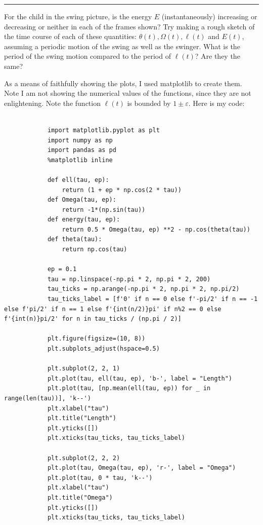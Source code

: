 \documentclass[12pt]{article}
\newcommand{\jump}{\vspace{5mm}}
\newcommand{\ep}{\varepsilon}
\begin{document}
\begin{enumerate}[]
        \hrule
        
        \jump
        For the child in the swing picture, is the energy $E$ (instantaneously) increasing or decreasing or neither in each of the frames shown? Try making a rough sketch of the time course of each of these quantities: $\theta(t), \Omega(t), \ell(t)$ and $E(t)$, assuming a periodic motion of the swing as well as the swinger. What is the period of the swing motion compared to the period of $\ell(t)$? Are they the same?

        \begin{solution}
            As a means of faithfully showing the plots, I used matplotlib to create them. Note I am not showing the numerical values of the functions, since they are not enlightening. Note the function $\ell(t)$ is bounded by $1 \pm \ep$. Here is my code:

            \begin{lstlisting}

            import matplotlib.pyplot as plt
            import numpy as np
            import pandas as pd
            %matplotlib inline

            def ell(tau, ep):
                return (1 + ep * np.cos(2 * tau))
            def Omega(tau, ep):
                return -1*(np.sin(tau))
            def energy(tau, ep):
                return 0.5 * Omega(tau, ep) **2 - np.cos(theta(tau))
            def theta(tau):
                return np.cos(tau)

            ep = 0.1
            tau = np.linspace(-np.pi * 2, np.pi * 2, 200)
            tau_ticks = np.arange(-np.pi * 2, np.pi * 2, np.pi/2)
            tau_ticks_label = [f'0' if n == 0 else f'-pi/2' if n == -1 else f'pi/2' if n == 1 else f'{int(n/2)}pi' if n%2 == 0 else f'{int(n)}pi/2' for n in tau_ticks / (np.pi / 2)] 
            
            plt.figure(figsize=(10, 8))
            plt.subplots_adjust(hspace=0.5)
            
            plt.subplot(2, 2, 1)
            plt.plot(tau, ell(tau, ep), 'b-', label = "Length")
            plt.plot(tau, [np.mean(ell(tau, ep)) for _ in range(len(tau))], 'k--')
            plt.xlabel("tau")
            plt.title("Length")
            plt.yticks([])  
            plt.xticks(tau_ticks, tau_ticks_label)
            
            plt.subplot(2, 2, 2)
            plt.plot(tau, Omega(tau, ep), 'r-', label = "Omega")
            plt.plot(tau, 0 * tau, 'k--')
            plt.xlabel("tau")
            plt.title("Omega")
            plt.yticks([])  
            plt.xticks(tau_ticks, tau_ticks_label)
            

\end{lstlisting}
\end{solution}
\end{enumerate}
\end{document}
